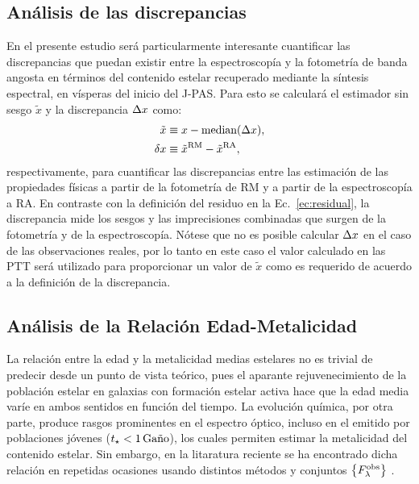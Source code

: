 \subsection{Análisis de las discrepancias}

En el presente estudio será particularmente interesante cuantificar las discrepancias que puedan
existir entre la espectroscopía y la fotometría de banda angosta en términos del contenido estelar
recuperado mediante la síntesis espectral, en vísperas del inicio del J-PAS. Para esto se calculará
el estimador sin sesgo $\tilde{x}$ y la discrepancia $\res{x}$ como:
%
\begin{subequations}\label{ec:discrepancy}
\begin{align}
\tilde{x} &\equiv x - \text{median}(\res{x}), \\
\dis{x}   &\equiv \tilde{x}^\text{RM}-\tilde{x}^\text{RA},
\end{align}
\end{subequations}
%
respectivamente, para cuantificar las discrepancias entre las estimación de las propiedades físicas
a partir de la fotometría de RM y a partir de la espectroscopía a RA. En contraste con la definición
del residuo en la Ec.~\eqref{ec:residual}, la discrepancia mide los sesgos y las imprecisiones
combinadas que surgen de la fotometría y de la espectroscopía. Nótese que no es posible calcular
$\res{x}$ en el caso de las observaciones reales, por lo tanto en este caso el valor calculado en
las PTT será utilizado para proporcionar un valor de $\tilde{x}$ como es requerido de acuerdo a la
definición de la discrepancia.

\subsection{Análisis de la Relación Edad-Metalicidad}

La relación entre la edad y la metalicidad medias estelares no es trivial de predecir desde un punto
de vista teórico, pues el aparante rejuvenecimiento de la población estelar en galaxias con
formación estelar activa hace que la edad media varíe en ambos sentidos en función del tiempo. La
evolución química, por otra parte, produce rasgos prominentes en el espectro óptico, incluso en el
emitido por poblaciones jóvenes ($t_\star<\unit[1]{Gaño}$), los cuales permiten estimar la
metalicidad del contenido estelar. Sin embargo, en la litaratura reciente se ha encontrado dicha
relación en repetidas ocasiones usando distintos métodos y conjuntos $\set{\sedt[F]{obs}}$
\citep[\eg,][]{Worthey1994, Gallazzi2005, Panter2008}.

